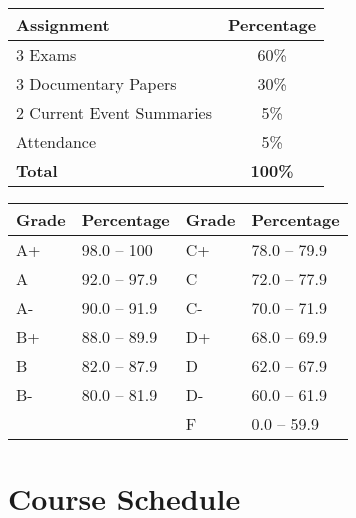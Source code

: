 \documentclass[12pt, letterpaper]{article}
\begin{document}
	
    \begin{center}
        \begin{minipage}[t]{.44\textwidth}
            \centering
            \begin{tabular}{l|c}
                \textbf{Assignment} & \textbf{Percentage} \\ \hline
            3 Exams & 60\% \\
            3 Documentary Papers & 30\% \\
            2 Current Event Summaries & 5\% \\
            Attendance & 5\% \\ \hline
            \textbf{Total} & \textbf{100\%} \\
            \end{tabular}
            \label{tab:grading_scheme}
        \end{minipage}\hspace{.07\textwidth}
        \begin{minipage}[t]{.44\textwidth}
            \centering
            \begin{tabular}{ll|ll}
                \textbf{Grade} & \textbf{Percentage} & \textbf{Grade} & \textbf{Percentage} \\ \hline
                A+ & 98.0 -- 100 & C+ & 78.0 -- 79.9 \\
                A  & 92.0 -- 97.9 & C  & 72.0 -- 77.9 \\
                A- & 90.0 -- 91.9 & C- & 70.0 -- 71.9 \\
                B+ & 88.0 -- 89.9 & D+ & 68.0 -- 69.9 \\
                B  & 82.0 -- 87.9 & D  & 62.0 -- 67.9 \\
                B- & 80.0 -- 81.9 & D- & 60.0 -- 61.9 \\
                    &               & F  & 0.0 -- 59.9 \\
                \hline
            \end{tabular}
            \label{tab:letter_grades}
        \end{minipage}
    \end{center}
\section*{Course Schedule}
\vspace{1cm}
\end{document}
